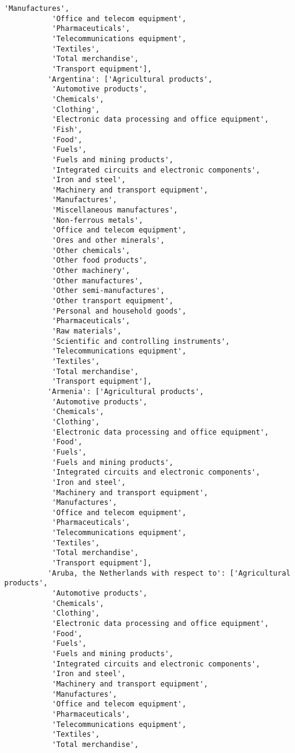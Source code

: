 \documentclass[11pt]{article}
\begin{document}
\begin{Verbatim}[commandchars=\\\{\}]
           'Manufactures',
           'Office and telecom equipment',
           'Pharmaceuticals',
           'Telecommunications equipment',
           'Textiles',
           'Total merchandise',
           'Transport equipment'],
          'Argentina': ['Agricultural products',
           'Automotive products',
           'Chemicals',
           'Clothing',
           'Electronic data processing and office equipment',
           'Fish',
           'Food',
           'Fuels',
           'Fuels and mining products',
           'Integrated circuits and electronic components',
           'Iron and steel',
           'Machinery and transport equipment',
           'Manufactures',
           'Miscellaneous manufactures',
           'Non-ferrous metals',
           'Office and telecom equipment',
           'Ores and other minerals',
           'Other chemicals',
           'Other food products',
           'Other machinery',
           'Other manufactures',
           'Other semi-manufactures',
           'Other transport equipment',
           'Personal and household goods',
           'Pharmaceuticals',
           'Raw materials',
           'Scientific and controlling instruments',
           'Telecommunications equipment',
           'Textiles',
           'Total merchandise',
           'Transport equipment'],
          'Armenia': ['Agricultural products',
           'Automotive products',
           'Chemicals',
           'Clothing',
           'Electronic data processing and office equipment',
           'Food',
           'Fuels',
           'Fuels and mining products',
           'Integrated circuits and electronic components',
           'Iron and steel',
           'Machinery and transport equipment',
           'Manufactures',
           'Office and telecom equipment',
           'Pharmaceuticals',
           'Telecommunications equipment',
           'Textiles',
           'Total merchandise',
           'Transport equipment'],
          'Aruba, the Netherlands with respect to': ['Agricultural products',
           'Automotive products',
           'Chemicals',
           'Clothing',
           'Electronic data processing and office equipment',
           'Food',
           'Fuels',
           'Fuels and mining products',
           'Integrated circuits and electronic components',
           'Iron and steel',
           'Machinery and transport equipment',
           'Manufactures',
           'Office and telecom equipment',
           'Pharmaceuticals',
           'Telecommunications equipment',
           'Textiles',
           'Total merchandise',

\end{Verbatim}
\end{document}
